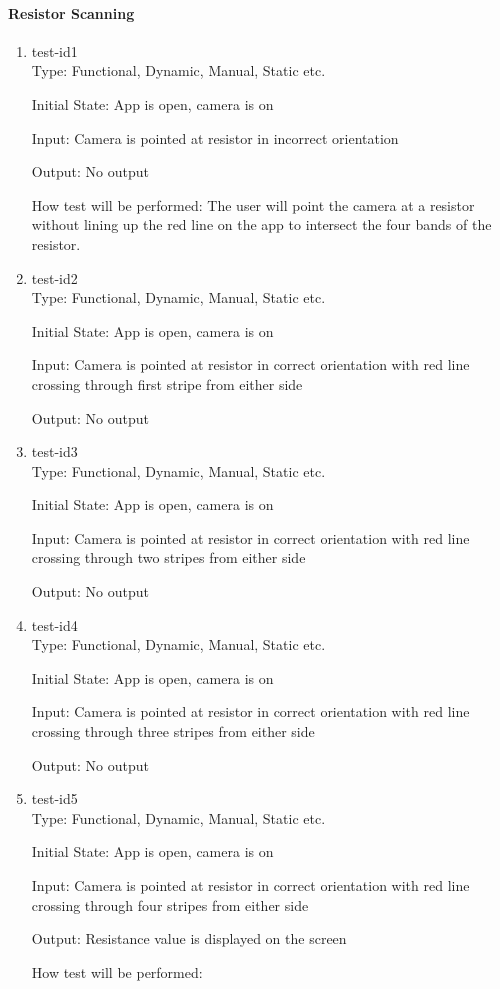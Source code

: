 \documentclass[12pt, titlepage]{article}
\begin{document}
\paragraph{Resistor Scanning}
\begin{enumerate}
\item{test-id1\\}
Type: Functional, Dynamic, Manual, Static etc.
					
Initial State: 
App is open, camera is on
					
Input: 
Camera is pointed at resistor in incorrect orientation
					
Output: 
No output
					
How test will be performed: 
The user will point the camera at a resistor without lining up the red line on the app to intersect the four bands of the resistor.
					
\item{test-id2\\}
Type: Functional, Dynamic, Manual, Static etc.
					
Initial State: 
App is open, camera is on
					
Input: 
Camera is pointed at resistor in correct orientation with red line crossing through first stripe from either side
					
Output: 
No output

\item{test-id3\\}
Type: Functional, Dynamic, Manual, Static etc.
					
Initial State: 
App is open, camera is on
					
Input: 
Camera is pointed at resistor in correct orientation with red line crossing through two stripes from either side
					
Output: 
No output	

\item{test-id4\\}
Type: Functional, Dynamic, Manual, Static etc.
					
Initial State: 
App is open, camera is on
					
Input: 
Camera is pointed at resistor in correct orientation with red line crossing through three stripes from either side
					
Output: 
No output	

\item{test-id5\\}
Type: Functional, Dynamic, Manual, Static etc.
					
Initial State: 
App is open, camera is on
					
Input: 
Camera is pointed at resistor in correct orientation with red line crossing through four stripes from either side
					
Output: 
Resistance value is displayed on the screen	
					
How test will be performed: 
\end{enumerate}
\end{document}
